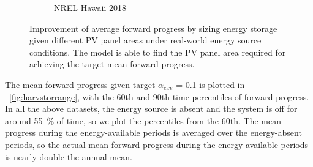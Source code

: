\begin{figure}
\begin{subfigure}{0.49\columnwidth}
        \caption{NREL Hawaii 2018}
        \label{fig:harvstor4}
    \end{subfigure}
    \caption{Improvement of average forward progress by sizing energy storage given different PV panel areas under real-world energy source conditions. The model is able to find the PV panel area required for achieving the target mean forward progress. } 
    \label{fig:harvstor}
\end{figure}


 The mean forward progress given target $\alpha_{exe}$ = 0.1 is plotted in \figurename{~\ref{fig:harvstorrange}}, with the 60th and 90th time percentiles of forward progress. In all the  above datasets, the energy source is absent and the system is off for around \SI{55}{\percent} of time, so we plot the percentiles from the 60th. The mean progress during the energy-available periods is averaged over the energy-absent periods, so the actual mean forward progress during the energy-available periods is nearly double the annual mean. 


